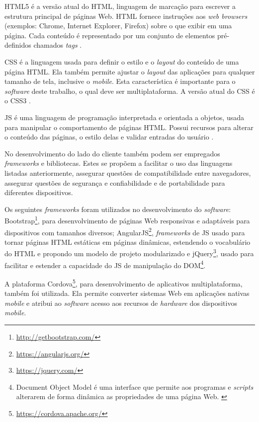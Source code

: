 HTML5 é a versão atual do HTML, linguagem de marcação para escrever a estrutura principal de páginas Web. HTML fornece instruções aos \textit{web browsers} (exemplos: Chrome, Internet Explorer, Firefox) sobre o que exibir em uma página. Cada conteúdo é representado por um conjunto de elementos pré-definidos chamados \textit{tags} \cite{html5}. \par 

CSS é a linguagem usada para definir o estilo e o \textit{layout} do conteúdo de uma página HTML. Ela também permite ajustar o \textit{layout} das aplicações para qualquer tamanho de tela, inclusive o \textit{mobile}. Esta característica é importante para o \textit{software} deste trabalho, o qual deve ser multiplataforma. A versão atual do CSS é o CSS3 \cite{css3}. \par
 
JS é uma linguagem de programação interpretada e orientada a objetos, usada para manipular o comportamento de páginas HTML. Possui recursos para alterar o conteúdo das páginas, o estilo delas e validar entradas do usuário \cite{javascript}. \par

No desenvolvimento do lado do cliente também podem ser empregados \textit{frameworks} e bibliotecas. Estes se propõem a facilitar o uso das linguagens listadas anteriormente, assegurar questões de compatibilidade entre navegadores, assegurar questões de segurança e confiabilidade e de portabilidade para diferentes dispositivos. \par

Os seguintes \textit{frameworks} foram utilizados no desenvolvimento do \textit{software}: Bootstrap\footnote{\url{http://getbootstrap.com/}}, para desenvolvimento de páginas Web responsivas e adaptáveis para dispositivos com tamanhos diversos; AngularJS\footnote{\url{https://angularjs.org/}}, \textit{frameworks} de JS usado para tornar páginas HTML estáticas em páginas dinâmicas, estendendo o vocabulário do HTML e propondo um modelo de projeto modularizado e jQuery\footnote{\url{https://jquery.com/}}, usado para facilitar e estender a capacidade do JS de manipulação do DOM\footnote{Document Object Model é uma interface que permite aos programas e \textit{scripts} alterarem de forma dinâmica as propriedades de uma página Web. \cite{w3cDOM}}. \par
 
A plataforma Cordova\footnote{\url{https://cordova.apache.org/}}, para desenvolvimento de aplicativos multiplataforma, também foi utilizada. Ela permite  converter sistemas Web em aplicações nativas \textit{mobile} e atribui ao \textit{software} acesso aos recursos de \textit{hardware} dos dispositivos \textit{mobile}. 

